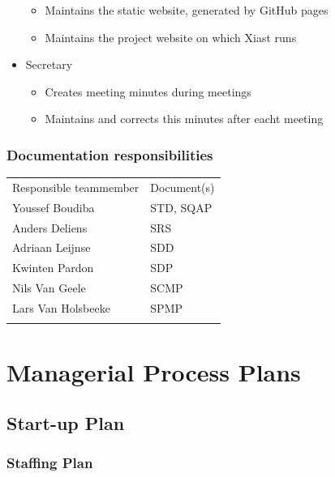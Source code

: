 \documentclass[12pt]{article}
\begin{document}
\begin{itemize}
  \begin{itemize}
  \itemsep1pt\parskip0pt
  \item
    Maintains the static website, generated by GitHub pages
  \item
    Maintains the project website on which Xiast runs
  \end{itemize}
\item
  Secretary

  \begin{itemize}
  \itemsep1pt\parskip0pt
  \item
    Creates meeting minutes during meetings
  \item
    Maintains and corrects this minutes after eacht meeting
  \end{itemize}
\end{itemize}

\subsubsection{Documentation
responsibilities}\label{documentation-responsibilities}

\begin{longtable}[c]{@{}ll@{}}
\hline\noalign{\medskip}
Responsible teammember & Document(s)
\\\noalign{\medskip}
\hline\noalign{\medskip}
Youssef Boudiba & STD, SQAP
\\\noalign{\medskip}
Anders Deliens & SRS
\\\noalign{\medskip}
Adriaan Leijnse & SDD
\\\noalign{\medskip}
Kwinten Pardon & SDP
\\\noalign{\medskip}
Nils Van Geele & SCMP
\\\noalign{\medskip}
Lars Van Holsbeeke & SPMP
\\\noalign{\medskip}
\hline
\end{longtable}

\section{Managerial Process Plans}\label{managerial-process-plans}

\subsection{Start-up Plan}\label{start-up-plan}

\subsubsection{Staffing Plan}\label{staffing-plan}
\end{document}
